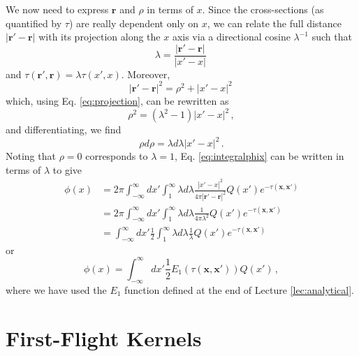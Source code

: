 We now need to express $\mathbf{r}$ and $\rho$ in terms of $x$.  Since the cross-sections (as quantified by $\tau$) are really dependent only on $x$, we can relate the full distance $|\mathbf{r}' - \mathbf{r}|$ with its projection along the $x$ axis via a directional cosine $\lambda^{-1}$ such that
\begin{equation}
 \lambda = \frac{|\mathbf{r}' - \mathbf{r}|}{|x'-x|} \, 
 \label{eq:projection}
\end{equation}
and $\tau(\mathbf{r}',\mathbf{r}) = \lambda \tau(x',x)$.  Moreover,
\begin{equation}
 |\mathbf{r}' - \mathbf{r}|^2 = \rho^2 + |x' - x|^2 \, 
\end{equation}
which, using Eq. \ref{eq:projection}, can be rewritten as
\begin{equation}
 \rho^2 = (\lambda^2 -1 )|x'-x|^2 \, ,
\end{equation}
and differentiating, we find
\begin{equation}
 \rho d\rho = \lambda d\lambda |x'-x|^2 \, .
\end{equation}
Noting that $\rho = 0$ corresponds to $\lambda = 1$, Eq. \ref{eq:integralphix} can be written in terms of $\lambda$ to give
\begin{equation}
\begin{split}
 \phi(x) &= 2\pi \int^{\infty}_{-\infty}dx' \int^{\infty}_1 \lambda d\lambda \frac{|x'-x|^2 }{4\pi|\mathbf{r}' - \mathbf{r}|^2}    Q(x')e^{-\tau(\mathbf{x},\mathbf{x}')} \\
        &= 2\pi \int^{\infty}_{-\infty}dx' \int^{\infty}_1 \lambda d\lambda \frac{1}{4\pi \lambda^2}    Q(x')e^{-\tau(\mathbf{x},\mathbf{x}')} \\       
        &=  \int^{\infty}_{-\infty} dx'\frac{1}{2} \int^{\infty}_1 \lambda d\lambda\frac{1}{\lambda}  Q(x')e^{-\tau(\mathbf{x},\mathbf{x}')} \, 
\end{split}
\end{equation}
or
\begin{equation}
 \phi(x) =  \int^{\infty}_{-\infty} dx'\frac{1}{2} E_1(\tau(\mathbf{x},\mathbf{x}'))Q(x') \, ,   
 \label{eq:integralphislab}     
\end{equation}
where we have used the $E_1$ function defined at the end of Lecture \ref{lec:analytical}.  

\section*{First-Flight Kernels}

